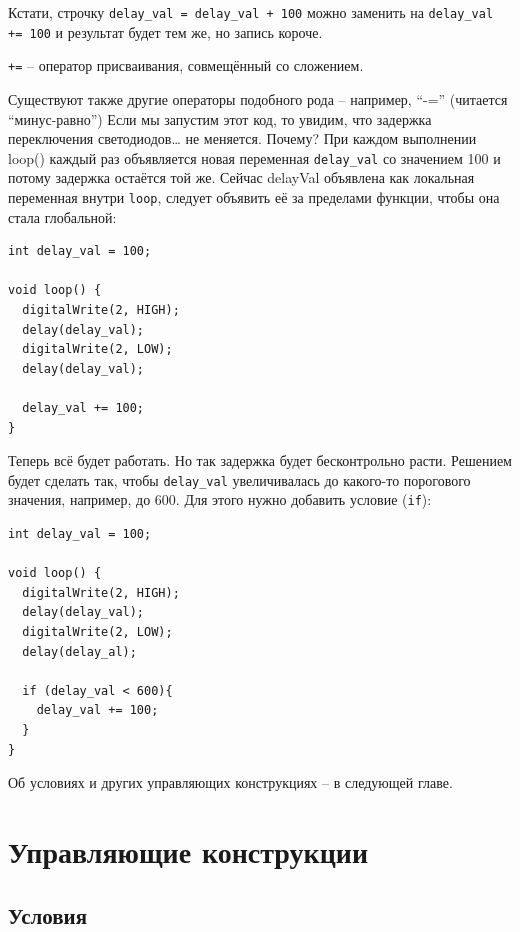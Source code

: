 \documentclass[a4paper,twoside]{book}
\begin{document}
Кстати, строчку \texttt{delay\_val = delay\_val + 100} можно заменить на
\texttt{delay\_val += 100} и результат будет тем же, но запись короче.

\texttt{+=} -- оператор присваивания, совмещённый со сложением.

Существуют также другие операторы подобного рода -- например, ``-=''
(читается ``минус-равно'') Если мы запустим этот код, то увидим, что задержка
переключения светодиодов… не меняется. Почему? При каждом выполнении loop()
каждый раз объявляется новая переменная \texttt{delay\_val} со значением 100 и
потому задержка остаётся той же. Сейчас delayVal объявлена как локальная
переменная внутри \texttt{loop}, следует объявить её за пределами функции, чтобы
она стала глобальной:

\begin{verbatim}
int delay_val = 100;

void loop() {
  digitalWrite(2, HIGH);
  delay(delay_val);
  digitalWrite(2, LOW);
  delay(delay_val);

  delay_val += 100;
}
\end{verbatim}

Теперь всё будет работать. Но так задержка будет бесконтрольно расти. Решением
будет сделать так, чтобы \texttt{delay\_val} увеличивалась до какого-то
порогового значения, например, до 600. Для этого нужно добавить условие
(\texttt{if}):

\begin{verbatim}
int delay_val = 100;

void loop() {
  digitalWrite(2, HIGH);
  delay(delay_val);
  digitalWrite(2, LOW);
  delay(delay_al);

  if (delay_val < 600){
    delay_val += 100;
  }
}
\end{verbatim}

Об условиях и других управляющих конструкциях -- в следующей главе.

\section{Управляющие конструкции}

\subsection{Условия}
\end{document}
